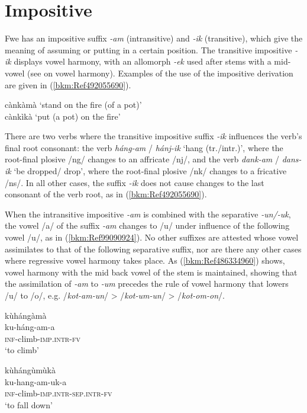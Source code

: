 \section{Impositive}
\label{bkm:Ref450835510}\hypertarget{Toc75352663}{}
Fwe has an impositive suffix \textit{-am} (intransitive) and \textit{-ik} (transitive), which give the meaning of assuming or putting in a certain position. The transitive impositive \textit{-ik} displays vowel harmony, with an allomorph \textit{-ek} used after stems with a mid-vowel (see  on vowel harmony). Examples of the use of the impositive derivation are given in (\ref{bkm:Ref492055690}).

\ea
\label{bkm:Ref492055690}
  cànkàmà  ‘stand on the fire (of a pot)’\\
cànkìkà  ‘put (a pot) on the fire’
\z

There are two verbs where the transitive impositive suffix \textit{-ik} influences the verb’s final root consonant: the verb \textit{háng-am} / \textit{hánj-ik} ‘hang (tr./intr.)’, where the root-final plosive /ng/ changes to an affricate /nj/, and the verb \textit{dank-am} / \textit{dans-ik} ‘be dropped/ drop’, where the root-final plosive /nk/ changes to a fricative /ns/. In all other cases, the suffix \textit{-ik} does not cause changes to the last consonant of the verb root, as in (\ref{bkm:Ref492055690}).

When the intransitive impositive \textit{-am} is combined with the separative \textit{-un/-uk}, the vowel /a/ of the suffix \textit{-am} changes to /u/ under influence of the following vowel /u/, as in (\ref{bkm:Ref99090924}). No other suffixes are attested whose vowel assimilates to that of the following separative suffix, nor are there any other cases where regressive vowel harmony takes place. As (\ref{bkm:Ref486334960}) shows, vowel harmony with the mid back vowel of the stem is maintained, showing that the assimilation of \textit{-am} to \textit{-um} precedes the rule of vowel harmony that lowers /u/ to /o/, e.g. /\textit{kot-am-un}/ > /\textit{kot-um-un}/ > /\textit{kot-om-on}/.

\ea
\label{bkm:Ref99090924}
\ea
kùhángàmà \\
ku-háng-am-a\\
\textsc{inf}-climb-\textsc{imp}.\textsc{intr}-\textsc{fv}\\
\glt ‘to climb’   

\ex
kùhángùmùkà\\
ku-hang-am-uk-a\\
\textsc{inf}-climb-\textsc{imp}.\textsc{intr}-\textsc{sep}.\textsc{intr}-\textsc{fv}\\
‘to fall down’
\z\z

